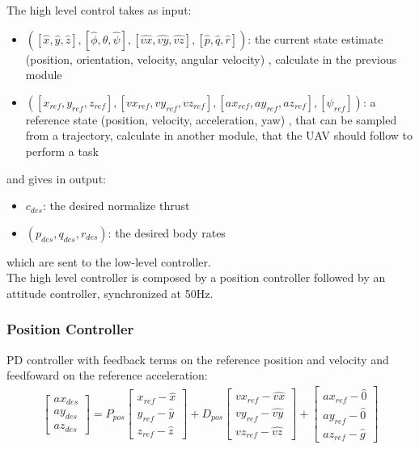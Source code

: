 The high level control takes as input: 
\begin{itemize}
\item $([\hat{x},\hat{y},\hat{z}],[\hat{\phi},\hat{\theta},\hat{\psi}],[\hat{vx},\hat{vy},\hat{vz}],[\hat{p},\hat{q},\hat{r}])$: the current state estimate (position, orientation, velocity, angular velocity) , calculate in the previous module
\item $([x_{ref},y_{ref},z_{ref}],[vx_{ref},vy_{ref},vz_{ref}],[ax_{ref},ay_{ref},az_{ref}],[\psi_{ref}])$: a reference state (position, velocity, acceleration, yaw) , that can be sampled from a trajectory, calculate in another module, that the UAV should follow to perform a task
\end{itemize}
and gives in output:
\begin{itemize}
\item $c_{des}$: the desired normalize thrust 
\item $(p_{des},q_{des},r_{des})$: the desired body rates
\end{itemize}
which are sent to the low-level controller.\\

The high level controller is composed by a position controller followed by an attitude controller, synchronized at 50Hz.

\subsubsection{Position Controller}
PD controller with feedback terms on the reference position and velocity and feedfoward on the reference acceleration:
\begin{align}
\begin{bmatrix}
ax_{des}  \\[10pt]
ay_{des}  \\[10pt]
az_{des}
\end{bmatrix} = P_{pos}
\begin{bmatrix}
x_{ref} - \hat{x} \\[10pt]
y_{ref} - \hat{y}  \\[10pt]
z_{ref} - \hat{z}
\end{bmatrix} + 
D_{pos}
\begin{bmatrix}
vx_{ref} - \hat{vx} \\[10pt]
vy_{ref} - \hat{vy}  \\[10pt]
vz_{ref} - \hat{vz}
\end{bmatrix}
+
\begin{bmatrix}
ax_{ref} - \hat{0} \\[10pt]
ay_{ref} - \hat{0}  \\[10pt]
az_{ref} - \hat{g}
\end{bmatrix}
\label{eq:PDcontroller1}
\end{align}

